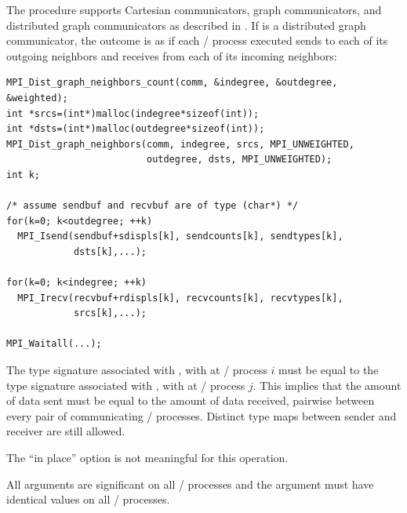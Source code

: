 The  procedure supports Cartesian communicators, \gb{}graph communicators, and
distributed graph communicators as described
in .
If  is a distributed graph communicator, the outcome is as if each
\MPI/ process executed sends to each of its outgoing neighbors and receives from
each of its incoming neighbors:

\begin{lstlisting}[language={[MPI]C}]
MPI_Dist_graph_neighbors_count(comm, &indegree, &outdegree, &weighted);
int *srcs=(int*)malloc(indegree*sizeof(int));
int *dsts=(int*)malloc(outdegree*sizeof(int));
MPI_Dist_graph_neighbors(comm, indegree, srcs, MPI_UNWEIGHTED,
                         outdegree, dsts, MPI_UNWEIGHTED);
int k;

/* assume sendbuf and recvbuf are of type (char*) */
for(k=0; k<outdegree; ++k)
  MPI_Isend(sendbuf+sdispls[k], sendcounts[k], sendtypes[k],
            dsts[k],...);

for(k=0; k<indegree; ++k)
  MPI_Irecv(recvbuf+rdispls[k], recvcounts[k], recvtypes[k],
            srcs[k],...);

MPI_Waitall(...);
\end{lstlisting}

The type signature associated with
\mpicode{[k]}, \mpicode{[k]}
with  at \MPI/ process $i$
must be equal to the type signature associated with
\mpicode{[l]}, \mpicode{[l]}
with  at \MPI/ process $j$.
This implies that the amount of data sent must be equal to the
amount of data received, pairwise between every pair of
communicating \MPI/ processes.
Distinct type maps between sender and receiver are still allowed.
 
The ``in place'' option is not meaningful for this operation.

All arguments are significant on all \MPI/ processes and the argument
 must have identical values on all \MPI/ processes.



